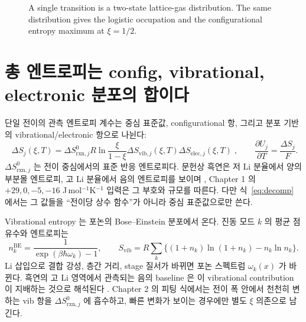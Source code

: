 \documentclass[11pt,a4paper]{article}
\newcommand{\rxn}{\mathrm{rxn}}
\newcommand{\config}{\mathrm{config}}
\newcommand{\vib}{\mathrm{vib}}
\newcommand{\elec}{\mathrm{elec}}
\newcommand{\BE}{\mathrm{BE}}
\begin{document}
\begin{figure}[t]
\centering
{}
\caption{A single transition is a two-state lattice-gas distribution. The same distribution gives the logistic occupation and the configurational entropy maximum at $\xi=1/2$.}
\label{fig:distribution}
\end{figure}

\section{총 엔트로피는 config, vibrational, electronic 분포의 합이다}\label{sec:decomp}
단일 전이의 관측 엔트로피 계수는 중심 표준값, configurational 항, 그리고 분포 기반의 vibrational/electronic
항으로 나뉜다:
\begin{equation}
\boxed{\;
\Delta S_j(\xi,T)
=\Delta S^0_{\rxn,j}
R\ln\frac{\xi}{1-\xi}
\Delta S_{\vib,j}(\xi,T)
\Delta S_{\elec,j}(\xi,T)\;,\qquad
\frac{\partial U_j}{\partial T}=\frac{\Delta S_j}{F}.
}
\label{eq:decomp}
\end{equation}
$\Delta S^0_{\rxn,j}$ 는 전이 중심에서의 표준 반응 엔트로피다. 문헌상 흑연은 저 Li 분율에서 양의
부분몰 엔트로피, 고 Li 분율에서 음의 엔트로피를 보이며 \cite{reynier2003,allart2018}, Chapter 1 의
$+29,0,-5,-16$ J\,mol$^{-1}$K$^{-1}$ 입력은 그 부호와 규모를 따른다. 다만 식~\eqref{eq:decomp} 에서는
그 값들을 ``전이당 상수 함수''가 아니라 중심 표준값으로만 쓴다.

Vibrational entropy 는 포논의 Bose--Einstein 분포에서 온다. 진동 모드 $k$ 의 평균 점유수와 엔트로피는
\begin{equation}
n_k^{\BE}=\frac{1}{\exp(\beta\hbar\omega_k)-1},\qquad
S_{\vib}=R\sum_k\{(1+n_k)\ln(1+n_k)-n_k\ln n_k\}.
\label{eq:vib}
\end{equation}
Li 삽입으로 결합 강성, 층간 거리, stage 질서가 바뀌면 포논 스펙트럼 $\omega_k(x)$ 가 바뀐다. 흑연의
고 Li 영역에서 관측되는 음의 baseline 은 이 vibrational contribution 이 지배하는 것으로 해석된다
\cite{reynier2003,jpcc2021}. Chapter 2 의 피팅 식에서는 전이 폭 안에서 천천히 변하는 vib 항을
$\Delta S^0_{\rxn,j}$ 에 흡수하고, 빠른 변화가 보이는 경우에만 별도 $\xi$ 의존으로 남긴다.
\end{document}
